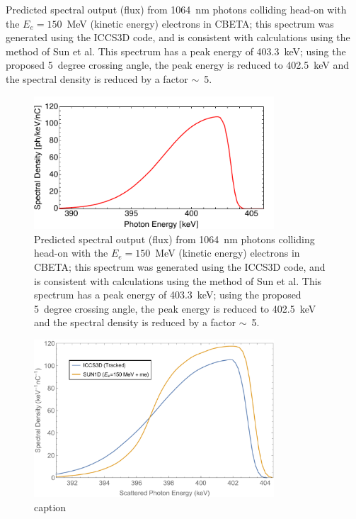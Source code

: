 \documentclass[../main.tex]{subfiles}
\begin{document}
Predicted spectral output (flux) from 1064~nm photons colliding head-on with the $E_e =150$~MeV (kinetic energy) electrons in CBETA; this spectrum was generated using the \textsc{ICCS3D} code, and is consistent with calculations using the method of Sun et al. This spectrum has a peak energy of 403.3~keV; using the proposed 5~degree crossing angle, the peak energy is reduced to 402.5~keV and the spectral density is reduced by a factor $\sim$~5.

\begin{figure}
\centering
\includegraphics[width=0.8\textwidth]{Figures/CBETA_Inverse_Compton_Source_Design/cbetaspectrumplot.pdf}
\caption{Predicted spectral output (flux) from 1064~nm photons colliding head-on with the $E_e =150$~MeV (kinetic energy) electrons in CBETA; this spectrum was generated using the \textsc{ICCS3D} code, and is consistent with calculations using the method of Sun et al. This spectrum has a peak energy of 403.3~keV; using the proposed 5~degree crossing angle, the peak energy is reduced to 402.5~keV and the spectral density is reduced by a factor $\sim$~5.}
\label{fig:my_label}
\end{figure}

\begin{figure}
\centering
\includegraphics[width=0.8\textwidth]{Figures/CBETA_Inverse_Compton_Source_Design/CBETAICSSpectra.pdf}
\caption{caption}
\label{fig:CBETA_ICS_Spectra}
\end{figure}
\end{document}

